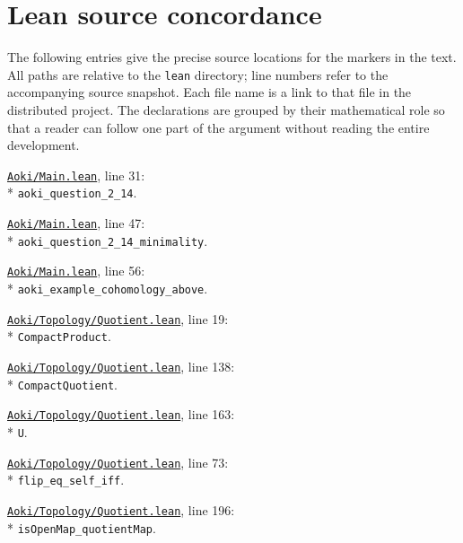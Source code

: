 \section{Lean source concordance}
\label{app:lean}

The following entries give the precise source locations for the markers
in the text. All paths are relative to the \texttt{lean} directory;
line numbers refer to the accompanying source snapshot. Each file name
is a link to that file in the distributed project. The declarations are
grouped by their mathematical role so that a reader can follow one part
of the argument without reading the entire development.

\begin{leansources}
\item \href{../../../lean/Aoki/Main.lean}{\nolinkurl{Aoki/Main.lean}}, line 31:\\*
\nolinkurl{aoki_question_2_14}.
\item \href{../../../lean/Aoki/Main.lean}{\nolinkurl{Aoki/Main.lean}}, line 47:\\*
\nolinkurl{aoki_question_2_14_minimality}.
\item \href{../../../lean/Aoki/Main.lean}{\nolinkurl{Aoki/Main.lean}}, line 56:\\*
\nolinkurl{aoki_example_cohomology_above}.
\end{leansources}

\begin{leansources}
\item \href{../../../lean/Aoki/Topology/Quotient.lean}{\nolinkurl{Aoki/Topology/Quotient.lean}}, line 19:\\*
\nolinkurl{CompactProduct}.
\item \href{../../../lean/Aoki/Topology/Quotient.lean}{\nolinkurl{Aoki/Topology/Quotient.lean}}, line 138:\\*
\nolinkurl{CompactQuotient}.
\item \href{../../../lean/Aoki/Topology/Quotient.lean}{\nolinkurl{Aoki/Topology/Quotient.lean}}, line 163:\\*
\nolinkurl{U}.
\item \href{../../../lean/Aoki/Topology/Quotient.lean}{\nolinkurl{Aoki/Topology/Quotient.lean}}, line 73:\\*
\nolinkurl{flip_eq_self_iff}.
\item \href{../../../lean/Aoki/Topology/Quotient.lean}{\nolinkurl{Aoki/Topology/Quotient.lean}}, line 196:\\*
\nolinkurl{isOpenMap_quotientMap}.
\end{leansources}

